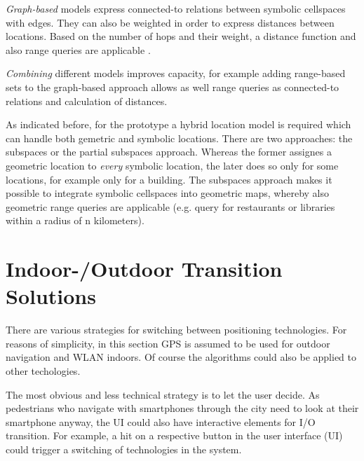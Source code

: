 \textit{Graph-based} models express connected-to relations between symbolic cellspaces with edges. They can also be weighted in order to express distances between locations. Based on the number of hops and their weight, a distance function and also range queries are applicable \cite{onLocationModels}.

\textit{Combining} different models improves capacity, for example adding range-based sets to the graph-based approach allows as well range queries as connected-to relations and calculation of distances.

As indicated before, for the prototype a hybrid location model is required which can handle both gemetric and symbolic locations. There are two approaches: the subspaces or the partial subspaces approach. Whereas the former assignes a geometric location to \textit{every} symbolic location, the later does so only for some locations, for example only for a building. The subspaces approach makes it possible to integrate symbolic cellspaces into geometric maps, whereby also geometric range queries are applicable \cite{onLocationModels} (e.g. query for restaurants or libraries within a radius of n kilometers).

\section{Indoor-/Outdoor Transition Solutions}

There are various strategies for switching between positioning technologies.
For reasons of simplicity, in this section GPS is assumed to be used for outdoor navigation and WLAN indoors. Of course the algorithms could also be applied to other techologies.

The most obvious and less technical strategy is to let the user decide. As pedestrians who navigate with smartphones through the city need to look at their smartphone anyway, the UI could also have interactive elements for I/O transition. For example, a hit on a respective button in the user interface (UI) could trigger a switching of technologies in the system.

